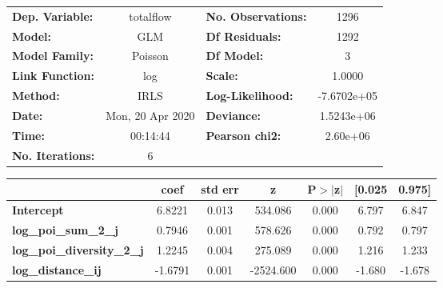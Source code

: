 \begin{center}
\begin{tabular}{lclc}
\toprule
\textbf{Dep. Variable:}            &    totalflow     & \textbf{  No. Observations:  } &      1296    \\
\textbf{Model:}                    &       GLM        & \textbf{  Df Residuals:      } &      1292    \\
\textbf{Model Family:}             &     Poisson      & \textbf{  Df Model:          } &         3    \\
\textbf{Link Function:}            &       log        & \textbf{  Scale:             } &     1.0000   \\
\textbf{Method:}                   &       IRLS       & \textbf{  Log-Likelihood:    } & -7.6702e+05  \\
\textbf{Date:}                     & Mon, 20 Apr 2020 & \textbf{  Deviance:          } &  1.5243e+06  \\
\textbf{Time:}                     &     00:14:44     & \textbf{  Pearson chi2:      } &   2.60e+06   \\
\textbf{No. Iterations:}           &        6         & \textbf{                     } &              \\
\bottomrule
\end{tabular}
\begin{tabular}{lcccccc}
                                   & \textbf{coef} & \textbf{std err} & \textbf{z} & \textbf{P$> |$z$|$} & \textbf{[0.025} & \textbf{0.975]}  \\
\midrule
\textbf{Intercept}                 &       6.8221  &        0.013     &   534.086  &         0.000        &        6.797    &        6.847     \\
\textbf{log\_poi\_sum\_2\_j}       &       0.7946  &        0.001     &   578.626  &         0.000        &        0.792    &        0.797     \\
\textbf{log\_poi\_diversity\_2\_j} &       1.2245  &        0.004     &   275.089  &         0.000        &        1.216    &        1.233     \\
\textbf{log\_distance\_ij}         &      -1.6791  &        0.001     & -2524.600  &         0.000        &       -1.680    &       -1.678     \\
\bottomrule
\end{tabular}
\end{center}
